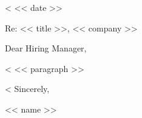 \documentclass[letterpaper,11pt]{article}
\begin{document}
<%
\vspace{1em}
<< date >>\par
Re: << title >>, << company >>\par
Dear Hiring Manager,\par
<%
<< paragraph >>\par
<%
Sincerely,\par
<< name >>
\end{document}
